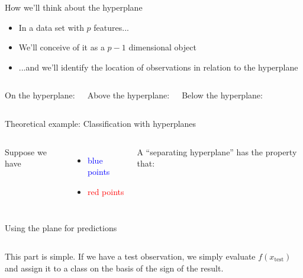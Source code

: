 \documentclass[mathserif, aspectratio=169]{beamer}
\begin{document}
\begin{frame}{How we'll think about the hyperplane}

\begin{itemize}
\item In a data set with $p$ features...
\item We'll conceive of it as a $p-1$ dimensional object 
\item ...and we'll identify the location of observations in relation to the hyperplane
\end{itemize}

\vspace{10mm}
\begin{columns}

On the hyperplane:
\vspace{10mm}

Above the hyperplane:
\vspace{10mm}

Below the hyperplane:
\end{columns}
\end{frame}

\begin{frame}{Theoretical example: Classification with hyperplanes}
\begin{columns}
Suppose we have
\begin{itemize}
\item \textcolor{blue}{blue points}
\item \textcolor{red}{red points}
\end{itemize}
\vspace{10mm}
A ``separating hyperplane'' has the property that:


\end{columns}

\end{frame}

\begin{frame}{Using the plane for predictions}
\begin{columns}
This part is simple.  If we have a test observation, we simply evaluate $f(x_\text{test})$ and assign it to a class on the basis of the sign of the result.

\end{columns}
\end{frame}
\end{document}
